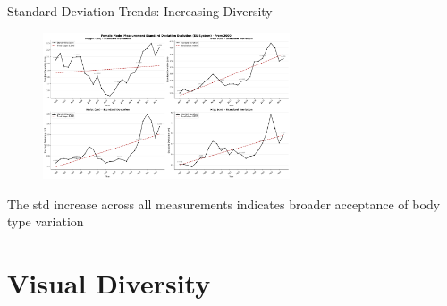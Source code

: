 \documentclass[aspectratio=169,xcolor=dvipsnames,10pt]{beamer}
\begin{document}
\begin{frame}{Standard Deviation Trends: Increasing Diversity}
    \begin{figure}
        \begin{center}
        \includegraphics[width=0.65\textwidth]{figures/std_evolution_female_eu_from_2000.png}
        \end{center}
    \end{figure}
    \pause
    \begin{block}\small{The std increase across all measurements indicates broader acceptance of body type variation}
    \end{block}
\end{frame}



\section{Visual Diversity}
\end{document}
